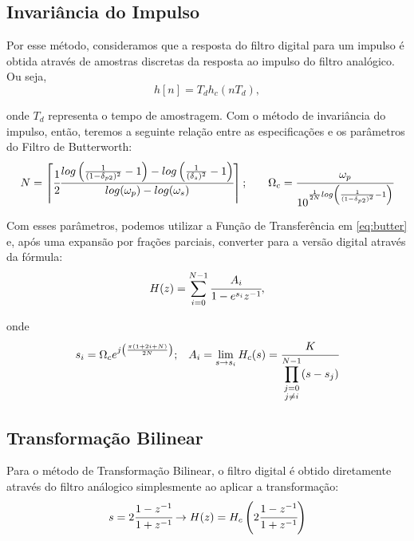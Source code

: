\documentclass[a4paper,11pt]{article}
\numberwithin{figure}{section}
\numberwithin{equation}{section}
\numberwithin{table}{section}
\theoremstyle{definition}
\begin{document}
\subsection{Invariância do Impulso}

Por esse método, consideramos que a resposta do filtro digital para um impulso é obtida através de amostras discretas da resposta ao impulso do filtro analógico. Ou seja,
\begin{equation}
	h[n] = T_d h_c(n T_d),
\end{equation}

\noindent onde $T_d$ representa o tempo de amostragem. Com o método de invariância do impulso, então, teremos a seguinte relação entre as especificações e os parâmetros do Filtro de Butterworth:
\begin{equation} \label{eq:impulse}
\begin{matrix}
	N = \left\lceil \cfrac{1}{2} \cfrac{log \left(\frac{1}{(1-\delta_{p2})^2} - 1 \right) - log \left( \frac{1}{(\delta_{s})^2} - 1 \right)}{log(\omega_p) - log(\omega_s)} \right\rceil; & & 
	\Omega_c = \cfrac{\omega_p}{10^{\frac{1}{2N} log \left(\frac{1}{(1-\delta_{p2})^2} - 1 \right)}}
\end{matrix}
\end{equation}

Com esses parâmetros, podemos utilizar a Função de Transferência em \eqref{eq:butter} e, após uma expansão por frações parciais, converter para a versão digital através da fórmula:
\begin{equation} \label{eq:impulse2}
	H(z) = \sum_{i=0}^{N-1} \cfrac{A_i}{1 - e^{s_i} z^{-1}}
,\end{equation}

\noindent onde
\begin{equation} 
\begin{matrix}
	s_i = \Omega_c e^{j\left( \frac{\pi(1+2i+N)}{2N} \right)}; & A_i = \displaystyle\lim_{s \to s_i} H_c(s) = \cfrac{K}{\displaystyle\prod_{\substack{j = 0 \\ j \neq i}}^{N-1} (s - s_j) }
\end{matrix}
\end{equation}

\subsection{Transformação Bilinear}

Para o método de Transformação Bilinear, o filtro digital é obtido diretamente através do filtro análogico simplesmente ao aplicar a transformação:
\begin{equation} \label{eq:bil_trans}
	s = 2\cfrac{1 - z^{-1}}{1 + z^{-1}} \rightarrow H(z) = H_c \left( 2\cfrac{1 - z^{-1}}{1 + z^{-1}} \right)
\end{equation}
\end{document}
